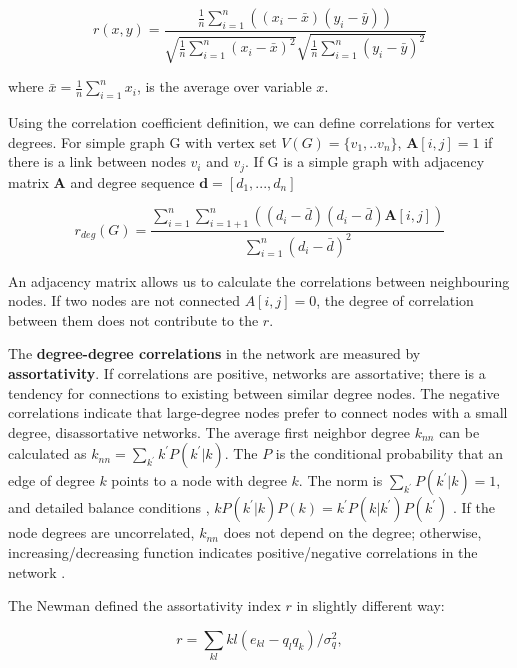 \begin{equation}
r(x, y) = \frac{\frac{1}{n}\sum_{i=1}^{n}((x_i - \bar{x} ) (y_i - \bar{y}) )}{\sqrt{\frac{1}{n}\sum_{i=1}^{n}(x_i - \bar{x})^2} \sqrt{\frac{1}{n}\sum_{i=1}^{n}(y_i - \bar{y})^2} }
\end{equation}

where $\bar{x} = \frac{1}{n}\sum_{i=1}^{n}x_i$, is the average over variable $x$.

Using the correlation coefficient definition, we can define correlations for vertex degrees. For simple graph G with vertex set $V(G) = \{v_1, ..v_n\}$, $\boldsymbol{A}[i,j] = 1$ if there is a link between nodes $v_i$ and $v_j$. If G is a simple graph with adjacency matrix $\boldsymbol{A}$ and degree sequence $\boldsymbol{d} = [d_1, ..., d_n]$

\begin{equation}
r_{deg}(G) = \frac{\sum_{i=1}^{n}\sum_{i=1+1}^{n}((d_i - \bar{d}) (d_i - \bar{d}) \boldsymbol{A}[i,j] )}{\sum_{i=1}^{n}(d_i - \bar{d})^2}
\end{equation}

An adjacency matrix allows us to calculate the correlations between neighbouring nodes. If two nodes are not connected $A[i,j]=0$, the degree of correlation between them does not contribute to the $r$.

The \textbf{degree-degree correlations} in the network are measured by \textbf{assortativity}. %
If correlations are positive, networks are assortative; there is a tendency for connections to existing between similar degree nodes. The negative correlations indicate that large-degree nodes prefer to connect nodes with a small degree, disassortative networks. The average first neighbor degree $k_{nn}$ can be calculated as $k_{nn} = \sum_{k^{'}}k^{'}P(k^{'}|{k})$. The $P$ is the conditional probability that an edge of degree $k$ points to a node with degree $k$. The norm is $\sum_{k^{'}}P(k^{'}|k)=1$, and detailed balance conditions \cite{boccaletti2006complex},  $kP(k^{'}|k)P(k) = k^{'}P(k|k^{'})P(k^{'})$ \cite{boccaletti2006complex}. If the node degrees are uncorrelated, $k_{nn}$ does not depend on the degree; otherwise, increasing/decreasing function indicates positive/negative correlations in the network \cite{park2003}.

The Newman defined the assortativity \cite{newman2002assortative} index $r$ in slightly different way:

\begin{equation}
r = \sum_{kl}kl(e_{kl} - q_lq_k) / \sigma_q^2 ,
\end{equation}

